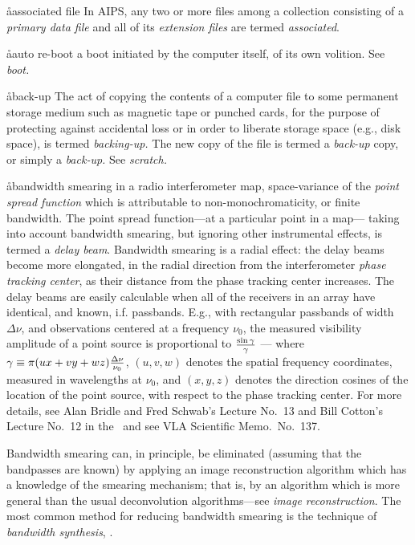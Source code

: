 \aa{associated file}
In AIPS, any two or more files among a collection
consisting of a {\it primary data file} and all of
its {\it extension files} are termed {\it associated}.

\aa{auto re-boot}
a boot initiated by the computer itself, of its own volition.
See {\it boot.}

\aa{back-up}
The act of copying the contents of a computer file
to some permanent storage medium such as magnetic tape or punched cards,
for the purpose of protecting against accidental loss
or in order to liberate storage space (e.g., disk space),
is termed {\it backing-up.}
The new copy of the file is termed a {\it back-up} copy,
or simply a {\it back-up.}
See {\it scratch.}

\aa{bandwidth smearing}
in a radio interferometer map, space-variance of the {\it point spread
function} which is attributable to non-monochromaticity, or finite bandwidth.
The point spread function---at a particular point in a map---%
taking into account bandwidth smearing, but
ignoring other instrumental effects, is termed a {\it delay beam}.
Bandwidth smearing is a radial effect: the delay beams become more
elongated, in the radial direction from the interferometer {\it phase tracking
center}, as their distance from the phase tracking center increases.
The delay beams are easily calculable when all of the receivers
in an array have identical, and known, i.f. passbands.
E.g., with rectangular passbands of width $\Delta\nu$, and observations
centered at a frequency $\nu_0$,
the measured visibility amplitude of a point source
is proportional to $\sin\gamma\over\gamma$ ---%
where $\gamma\equiv\pi(ux+vy+wz){\Delta\nu\over\nu_0}$,
$(u,v,w)$ denotes the spatial frequency coordinates, measured in wavelengths
at $\nu_0$, and $(x,y,z)$ denotes the direction cosines of the location of the
point source, with respect to the phase tracking center.
For more details, see Alan Bridle and Fred Schwab's Lecture No.~13
and Bill Cotton's Lecture No.~12 in the \sira\ and
see VLA Scientific Memo.\ No.~137.
\par
Bandwidth smearing can, in principle, be eliminated
(assuming that the bandpasses are known) by applying an
image reconstruction algorithm which has a knowledge of the smearing
mechanism; that is, by an algorithm which is more general than the usual
deconvolution algorithms---see {\it image reconstruction}.
The most common method for reducing bandwidth smearing
is the technique of {\it bandwidth synthesis}, \qv.

